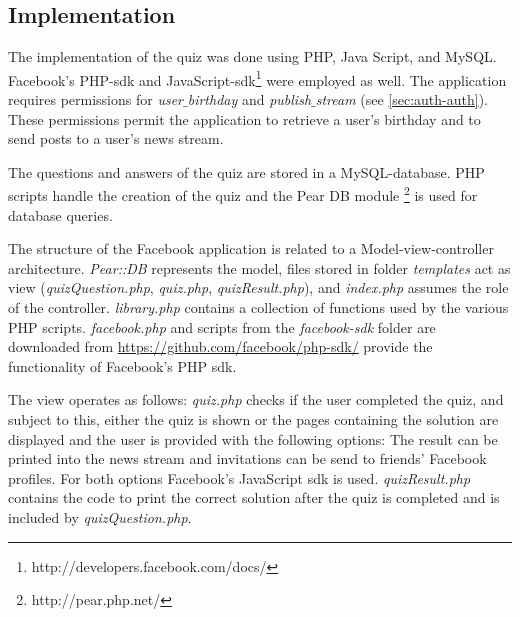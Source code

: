 \documentclass[preprint,12pt]{elsarticle}
\begin{document}
\subsection{Implementation}
\label{sec:implementation}
The implementation of the quiz was done using PHP, Java Script, and MySQL.
Facebook's PHP-\ac{sdk} and
JavaScript-\ac{sdk}\footnote{http://developers.facebook.com/docs/}
were employed as well. The application requires
permissions for \textit{user$\_$birthday} and
\textit{publish$\_$stream} (see \ref{sec:auth-auth}). These
permissions permit the application to retrieve a user's birthday and to
send posts to a user's news stream.

The questions and answers of the quiz are stored in a MySQL-database. PHP scripts
handle the creation of the quiz and
the Pear DB module \footnote{http://pear.php.net/} is used
for database queries.

The structure of the Facebook application is related to a
Model-view-controller architecture. \textit{Pear::DB} represents the
model, files stored in folder \textit{templates} act as view
(\textit{quizQuestion.php}, \textit{quiz.php},
\textit{quizResult.php}), and \textit{index.php} assumes the role of
the controller. \textit{library.php} contains a collection of
functions used by the various PHP scripts. \textit{facebook.php} and
scripts from the \textit{facebook-sdk} folder are downloaded from
\url{https://github.com/facebook/php-sdk/} provide the functionality
of Facebook's PHP \ac{sdk}.

The view operates as follows: \textit{quiz.php} checks if the user
completed the quiz, and subject to this, either the quiz is shown or
the pages containing the solution are displayed and the user is
provided with
the following options:  The result can be printed into the news
stream and invitations can be send to friends' Facebook
profiles. For both options Facebook's JavaScript \ac{sdk} is
used. \textit{quizResult.php} contains the code to  
print the correct solution after the quiz is completed and is included
by \textit{quizQuestion.php}. 
\end{document}
